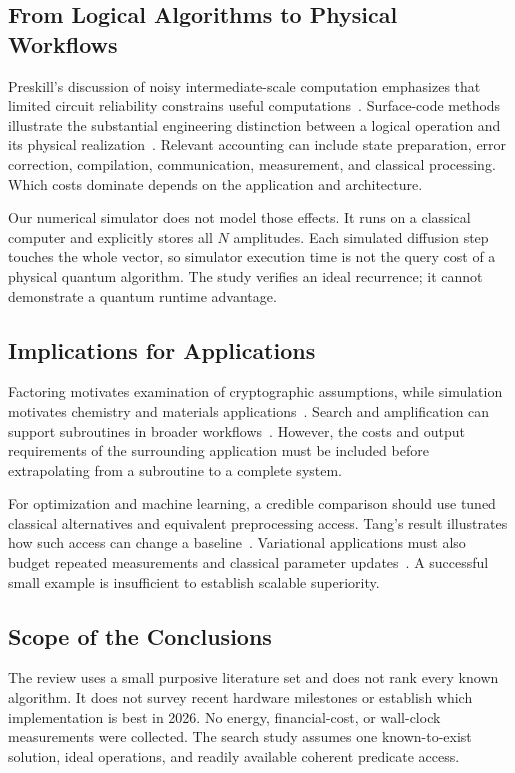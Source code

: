 \documentclass[conference]{IEEEtran}
\begin{document}
\subsection{From Logical Algorithms to Physical Workflows}
Preskill's discussion of noisy intermediate-scale computation emphasizes that limited circuit reliability constrains useful computations~\cite{preskill}. Surface-code methods illustrate the substantial engineering distinction between a logical operation and its physical realization~\cite{fowler}. Relevant accounting can include state preparation, error correction, compilation, communication, measurement, and classical processing. Which costs dominate depends on the application and architecture.

Our numerical simulator does not model those effects. It runs on a classical computer and explicitly stores all $N$ amplitudes. Each simulated diffusion step touches the whole vector, so simulator execution time is not the query cost of a physical quantum algorithm. The study verifies an ideal recurrence; it cannot demonstrate a quantum runtime advantage.

\subsection{Implications for Applications}
Factoring motivates examination of cryptographic assumptions, while simulation motivates chemistry and materials applications~\cite{shor,mcardle}. Search and amplification can support subroutines in broader workflows~\cite{brassard}. However, the costs and output requirements of the surrounding application must be included before extrapolating from a subroutine to a complete system.

For optimization and machine learning, a credible comparison should use tuned classical alternatives and equivalent preprocessing access. Tang's result illustrates how such access can change a baseline~\cite{tang}. Variational applications must also budget repeated measurements and classical parameter updates~\cite{cerezo}. A successful small example is insufficient to establish scalable superiority.

\subsection{Scope of the Conclusions}
The review uses a small purposive literature set and does not rank every known algorithm. It does not survey recent hardware milestones or establish which implementation is best in 2026. No energy, financial-cost, or wall-clock measurements were collected. The search study assumes one known-to-exist solution, ideal operations, and readily available coherent predicate access.
\end{document}
